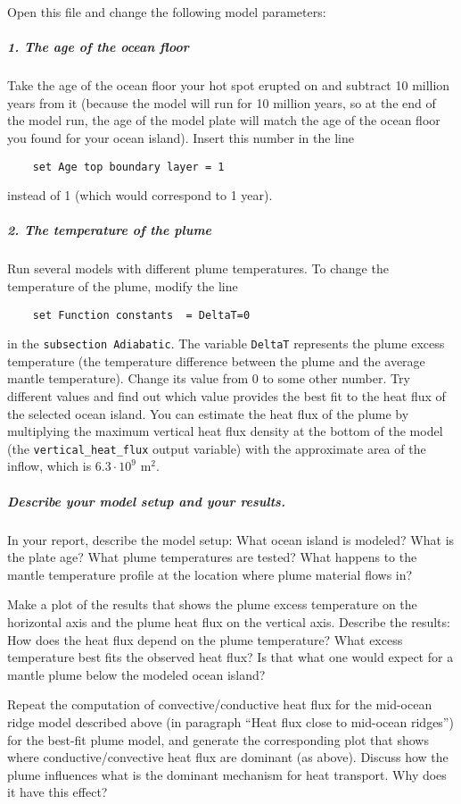 Open this file and change the following model parameters:

\subparagraph{1. The age of the ocean floor}
Take the age of the ocean floor your hot spot erupted on and subtract 10 million years from it (because the model will run for 10 million years, so at the end of the model run, the age of the model plate will match the age of the ocean floor you found for your ocean island). 
Insert this number in the line

\begin{verbatim}
    set Age top boundary layer = 1
\end{verbatim}

instead of 1 (which would correspond to 1 year). 

\subparagraph{2. The temperature of the plume}
Run several models with different plume temperatures. To change the temperature of the plume, modify the line

\begin{verbatim}
    set Function constants  = DeltaT=0
\end{verbatim}

in the \texttt{subsection Adiabatic}. The variable \texttt{DeltaT} represents the plume excess temperature (the temperature difference between the plume and the average mantle temperature). Change its value from 0 to some other number. Try different values and find out which value provides the best fit to the heat flux of the selected ocean island. You can estimate the heat flux of the plume by multiplying the maximum vertical heat flux density at the bottom of the model (the \texttt{vertical\_heat\_flux} output variable) with the approximate area of the inflow, which is $6.3 \cdot 10^9$ m$^2$. 

\subparagraph{Describe your model setup and your results.}
In your report, describe the model setup: What ocean island is modeled? What is the plate age? What plume temperatures are tested? What happens to the mantle temperature profile at the location where plume material flows in?

Make a plot of the results that shows the plume excess temperature on the horizontal axis and the plume heat flux on the vertical axis. Describe the results: How does the heat flux depend on the plume temperature? What excess temperature best fits the observed heat flux? Is that what one would expect for a mantle plume below the modeled ocean island? 

Repeat the computation of convective/conductive heat flux for the mid-ocean ridge model described above (in paragraph ``Heat flux close to mid-ocean ridges'') for the best-fit plume model, 
and generate the corresponding plot that shows where conductive/convective heat flux are dominant (as above). Discuss how the plume influences what is the dominant mechanism for heat transport. Why does it have this effect?

